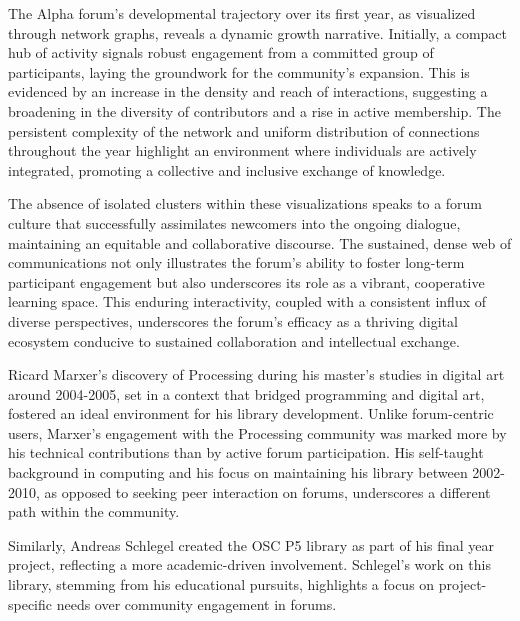 \begin{minipage}[t]{0.25\textwidth}
  \vspace{8mm}
  \small
  The Alpha forum's developmental trajectory over its first year, as visualized through network graphs, reveals a dynamic growth narrative. Initially, a compact hub of activity signals robust engagement from a committed group of participants, laying the groundwork for the community's expansion. This is evidenced by an increase in the density and reach of interactions, suggesting a broadening in the diversity of contributors and a rise in active membership. The persistent complexity of the network and uniform distribution of connections throughout the year highlight an environment where individuals are actively integrated, promoting a collective and inclusive exchange of knowledge.

  \medskip
  The absence of isolated clusters within these visualizations speaks to a forum culture that successfully assimilates newcomers into the ongoing dialogue, maintaining an equitable and collaborative discourse. The sustained, dense web of communications not only illustrates the forum's ability to foster long-term participant engagement but also underscores its role as a vibrant, cooperative learning space. This enduring interactivity, coupled with a consistent influx of diverse perspectives, underscores the forum's efficacy as a thriving digital ecosystem conducive to sustained collaboration and intellectual exchange.

\end{minipage}


Ricard Marxer's discovery of Processing during his master's studies in digital art around 2004-2005, set in a context that bridged programming and digital art, fostered an ideal environment for his library development. Unlike forum-centric users, Marxer's engagement with the Processing community was marked more by his technical contributions than by active forum participation. His self-taught background in computing and his focus on maintaining his library between 2002-2010, as opposed to seeking peer interaction on forums, underscores a different path within the community​​​​.

Similarly, Andreas Schlegel created the OSC P5 library as part of his final year project, reflecting a more academic-driven involvement. Schlegel's work on this library, stemming from his educational pursuits, highlights a focus on project-specific needs over community engagement in forums​​.


